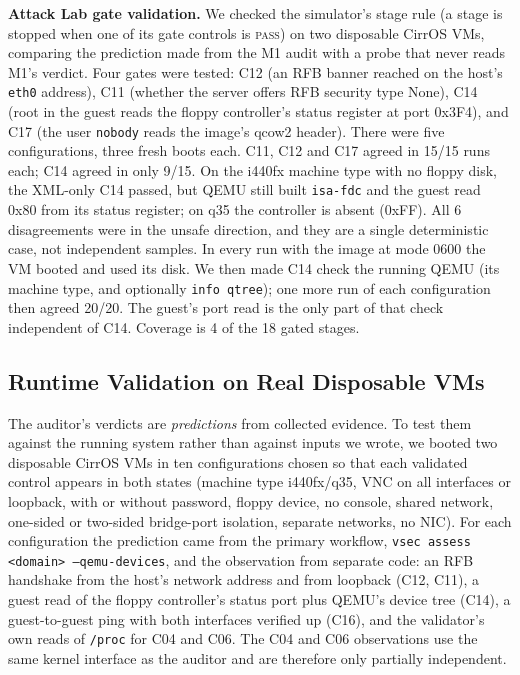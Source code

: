 \documentclass[conference]{IEEEtran}
\newcommand{\pass}{\textsc{pass}}
\begin{document}
\textbf{Attack Lab gate validation.} We checked the simulator's stage rule (a stage is stopped when one of its gate controls is \pass) on two disposable CirrOS VMs, comparing the prediction made from the M1 audit with a probe that never reads M1's verdict. Four gates were tested: C12 (an RFB banner reached on the host's \texttt{eth0} address), C11 (whether the server offers RFB security type None), C14 (root in the guest reads the floppy controller's status register at port 0x3F4), and C17 (the user \texttt{nobody} reads the image's qcow2 header). There were five configurations, three fresh boots each. C11, C12 and C17 agreed in 15/15 runs each; C14 agreed in only 9/15. On the i440fx machine type with no floppy disk, the XML-only C14 passed, but QEMU still built \texttt{isa-fdc} and the guest read 0x80 from its status register; on q35 the controller is absent (0xFF). All 6 disagreements were in the unsafe direction, and they are a single deterministic case, not independent samples. In every run with the image at mode 0600 the VM booted and used its disk. We then made C14 check the running QEMU (its machine type, and optionally \texttt{info qtree}); one more run of each configuration then agreed 20/20. The guest's port read is the only part of that check independent of C14. Coverage is 4 of the 18 gated stages.

\subsection{Runtime Validation on Real Disposable VMs}\label{sec:rv}
The auditor's verdicts are \emph{predictions} from collected evidence. To test them against the running system rather than against inputs we wrote, we booted two disposable CirrOS VMs in ten configurations chosen so that each validated control appears in both states (machine type i440fx/q35, VNC on all interfaces or loopback, with or without password, floppy device, no console, shared network, one-sided or two-sided bridge-port isolation, separate networks, no NIC). For each configuration the prediction came from the primary workflow, \texttt{vsec assess <domain> --qemu-devices}, and the observation from separate code: an RFB handshake from the host's network address and from loopback (C12, C11), a guest read of the floppy controller's status port plus QEMU's device tree (C14), a guest-to-guest ping with both interfaces verified up (C16), and the validator's own reads of \texttt{/proc} for C04 and C06. The C04 and C06 observations use the same kernel interface as the auditor and are therefore only partially independent.
\end{document}
